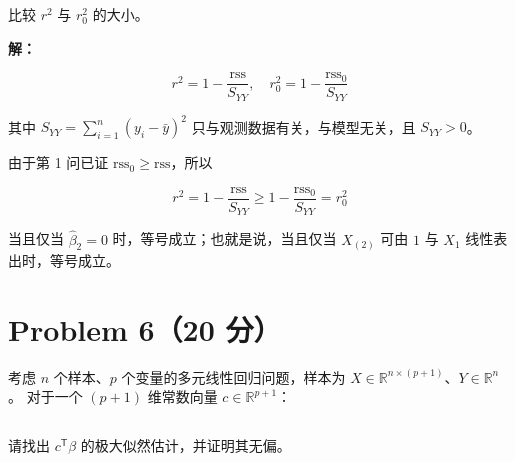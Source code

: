\documentclass[12pt,a4paper]{article}
\begin{document}
比较 $r^2$ 与 $r_0^2$ 的大小。

\begin{answerbox}
\textbf{解：}

$$
r^2=1-\frac{\mathrm{rss}}{S_{YY}}, \quad r_0^2=1-\frac{\mathrm{rss}_0}{S_{YY}}
$$

其中 $S_{YY}=\sum_{i=1}^{n}(y_i-\bar{y})^2$ 只与观测数据有关，与模型无关，且 $S_{YY}>0$。

由于第 1 问已证 $\mathrm{rss}_0 \geq \mathrm{rss}$，所以

$$
r^2 = 1-\frac{\mathrm{rss}}{S_{YY}} \geq 1-\frac{\mathrm{rss}_0}{S_{YY}} = r_0^2
$$

当且仅当 $\hat{\beta}_2=0$ 时，等号成立；也就是说，当且仅当 $X_{(2)}$ 可由 $1$ 与 $X_{1}$ 线性表出时，等号成立。

\end{answerbox}


\section{Problem 6（20 分）}

考虑 $n$ 个样本、$p$ 个变量的多元线性回归问题，样本为
$X\in\mathbb{R}^{n\times(p+1)}$、$Y\in\mathbb{R}^n$。
对于一个 $(p+1)$ 维常数向量 $c\in\mathbb{R}^{p+1}$：

\subsection{}

请找出 $c^\mathsf{T}\beta$ 的极大似然估计，并证明其无偏。
\end{document}

